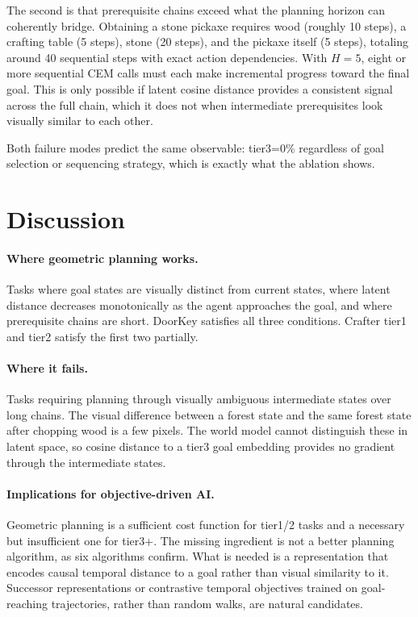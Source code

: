 \documentclass[12pt]{article}
\begin{document}
The second is that prerequisite chains exceed what the planning horizon can coherently bridge. Obtaining a stone pickaxe requires wood (roughly 10 steps), a crafting table (5 steps), stone (20 steps), and the pickaxe itself (5 steps), totaling around 40 sequential steps with exact action dependencies. With $H=5$, eight or more sequential CEM calls must each make incremental progress toward the final goal. This is only possible if latent cosine distance provides a consistent signal across the full chain, which it does not when intermediate prerequisites look visually similar to each other.

Both failure modes predict the same observable: tier3=0\% regardless of goal selection or sequencing strategy, which is exactly what the ablation shows.

\section{Discussion}

\paragraph{Where geometric planning works.} Tasks where goal states are visually distinct from current states, where latent distance decreases monotonically as the agent approaches the goal, and where prerequisite chains are short. DoorKey satisfies all three conditions. Crafter tier1 and tier2 satisfy the first two partially.

\paragraph{Where it fails.} Tasks requiring planning through visually ambiguous intermediate states over long chains. The visual difference between a forest state and the same forest state after chopping wood is a few pixels. The world model cannot distinguish these in latent space, so cosine distance to a tier3 goal embedding provides no gradient through the intermediate states.

\paragraph{Implications for objective-driven AI.} Geometric planning is a sufficient cost function for tier1/2 tasks and a necessary but insufficient one for tier3+. The missing ingredient is not a better planning algorithm, as six algorithms confirm. What is needed is a representation that encodes causal temporal distance to a goal rather than visual similarity to it. Successor representations or contrastive temporal objectives trained on goal-reaching trajectories, rather than random walks, are natural candidates.
\end{document}
